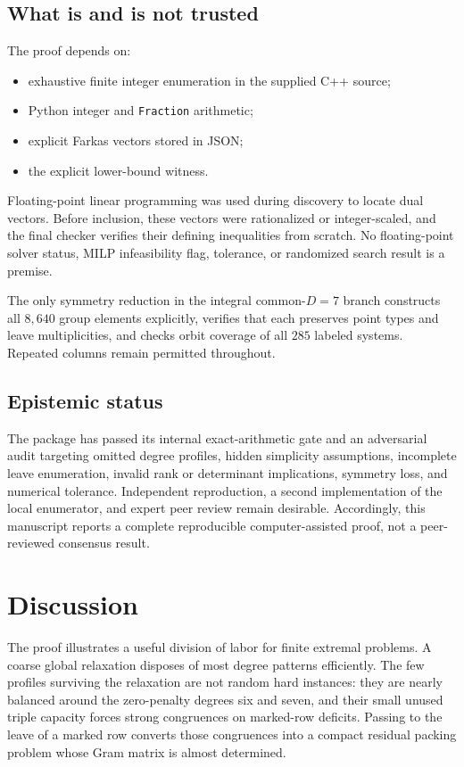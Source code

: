 \documentclass[10pt,a4paper]{amsart}
\begin{document}
\subsection{What is and is not trusted}
The proof depends on:
\begin{itemize}
\item exhaustive finite integer enumeration in the supplied C++ source;
\item Python integer and \texttt{Fraction} arithmetic;
\item explicit Farkas vectors stored in JSON;
\item the explicit lower-bound witness.
\end{itemize}
Floating-point linear programming was used during discovery to locate dual vectors. Before inclusion, these vectors were rationalized or integer-scaled, and the final checker verifies their defining inequalities from scratch. No floating-point solver status, MILP infeasibility flag, tolerance, or randomized search result is a premise.

The only symmetry reduction in the integral common-$D=7$ branch constructs all $8{,}640$ group elements explicitly, verifies that each preserves point types and leave multiplicities, and checks orbit coverage of all $285$ labeled systems. Repeated columns remain permitted throughout.

\subsection{Epistemic status}
The package has passed its internal exact-arithmetic gate and an adversarial audit targeting omitted degree profiles, hidden simplicity assumptions, incomplete leave enumeration, invalid rank or determinant implications, symmetry loss, and numerical tolerance. Independent reproduction, a second implementation of the local enumerator, and expert peer review remain desirable. Accordingly, this manuscript reports a complete reproducible computer-assisted proof, not a peer-reviewed consensus result.

\section{Discussion}
The proof illustrates a useful division of labor for finite extremal problems. A coarse global relaxation disposes of most degree patterns efficiently. The few profiles surviving the relaxation are not random hard instances: they are nearly balanced around the zero-penalty degrees six and seven, and their small unused triple capacity forces strong congruences on marked-row deficits. Passing to the leave of a marked row converts those congruences into a compact residual packing problem whose Gram matrix is almost determined.
\end{document}

